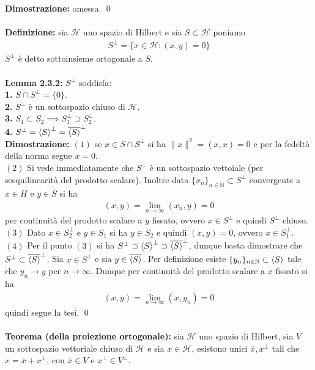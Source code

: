 \documentclass{article}
\numberwithin{equation}{subsection}
\begin{document}
\textbf{Dimostrazione:} omessa. \qed \\ \\
\textbf{Definizione:} sia $\mathcal{H}$ uno spazio di Hilbert e sia $S \subset \mathcal{H}$ poniamo
\begin{align*}
    S^\perp = \{x \in \mathcal{H} : (x, y) = 0\} 
\end{align*}
$S^\perp$ è detto sottoinsieme ortogonale a $S$. \\ \\
\textbf{Lemma 2.3.2:} $S^\perp$ soddisfa: \\
\textbf{1.} $S \cap S^\perp = \{0\}$. \\
\textbf{2.} $S^\perp$ è un sottospazio chiuso di $\mathcal{H}$. \\
\textbf{3.} $S_1 \subset S_2 \implies S^\perp_1 \supset S^\perp_2$. \\
\textbf{4.} $S^\perp = \braket{S}^\perp = \overline{\braket{S}}^\perp$ \\

\textbf{Dimostrazione:} $(1)$ se $x \in S \cap S^\perp$ si ha $\|x\|^2 = (x, x) = 0$ e per la fedeltà della norma segue $x = 0$. \\
$(2)$ Si vede immediatamente che $S^\perp$ è un sottospazio vettoiale (per sesquilinearità del prodotto scalare). Inoltre data $\{x_n\}_{n \in \mathbb{N}} \subset S^\perp$ convergente a $x \in H$ e $y \in S$ si ha 
\begin{align*}
    (x, y) = \lim_{n \rightarrow \infty}(x_n, y) = 0 
\end{align*}
per continuità del prodotto scalare a $y$ fissato, ovvero $x \in S^\perp$ e quindi $S^\perp$ chiuso. \\
$(3)$ Dato $x \in S^\perp_2$ e $y \in S_1$ si ha $y \in S_2$ e quindi $(x, y) = 0$, ovvero $x \in S^\perp_1$. \\
$(4)$ Per il punto $(3)$ si ha $S^\perp \supset \braket{S}^\perp \supset \overline{\braket{S}}^\perp$, dunque basta dimostrare che $S^\perp \subset \overline{\braket{S}}^\perp$. Sia $x \in S^\perp$ e sia $y \in \overline{\braket{S}}$. Per definizione esiste $\{y_n\}_{n \in \mathbb{N}} \subset \braket{S}$ tale che $y_n \rightarrow y$ per $n \rightarrow \infty$. Dunque per continuità del prodotto scalare a $x$ fissato si ha 
\begin{align*}
    (x, y) = \lim_{n \rightarrow \infty}(x, y_n) = 0 
\end{align*}
quindi segue la tesi. \qed \\ \\
\textbf{Teorema (della proiezione ortogonale):} sia $\mathcal{H}$ uno spazio di Hilbert, sia $V$ un sottospazio vettoriale chiuso di $\mathcal{H}$ e sia $x \in \mathcal{H}$, esistono unici $\overline{x}, x^\perp$ tali che $x = \overline{x} + x^\perp$, con $\overline{x} \in V$ e $x^\perp \in V^\perp$. \\
\end{document}
